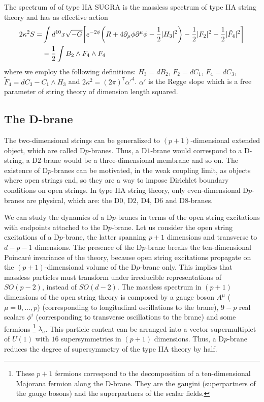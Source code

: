 The spectrum of of type IIA SUGRA is the massless spectrum of type IIA string theory and has as effective action 
\begin{align}
2\kappa^2 S=&\int d^{10}x \sqrt{-G}\qty[e^{-2\phi}\qty(R+4\partial_\mu\phi \partial^\mu\phi-\frac{1}{2}|H_3|^2)-\frac{1}{2}|F_2|^2-\frac{1}{2}|\tilde F_4|^2]\\& -\frac{1}{2}\int B_2\wedge F_4\wedge F_4
\end{align}
where we employ the following definitions:
$H_3=dB_2$, $F_2=dC_1$, $F_4=dC_3$, $\tilde F_4=dC_3 -C_1\wedge H_3$ and $2\kappa^2 =(2\pi)^7 \alpha'^4$.
$\alpha'$ is the Regge slope which is a free parameter of string theory of dimension length squared.


\subsection{The D-brane}

The two-dimensional strings can be generalized to $(p+1)$-dimensional extended object, which are called D$p$-branes.
Thus, a D$1$-brane would correspond to a D-string, a D$2$-brane would be a three-dimensional membrane and so on.
The existence of D$p$-branes can be motivated, in the weak coupling limit, as 
objects where open strings end, so they are a way to impose Dirichlet boundary conditions on open strings.
In type IIA string theory, only even-dimensional D$p$-branes are physical, which are: the D$0$, D$2$, D$4$, D$6$ and D$8$-branes.

We can study the dynamics of a D$p$-branes in terms of the open string excitations  with endpoints
attached to the D$p$-brane.
Let us consider the open string excitations of a D$p$-brane, the latter spanning $p+1$ dimensions and transverse to $d-p-1$ dimensions.
The presence of the D$p$-brane breaks the ten-dimensional Poincaré invariance of the theory, because
open string excitations propagate on the $(p+1)$-dimensional volume of the D$p$-brane only.
This implies that massless particles must transform under irreducible representations of $SO(p-2)$, instead of
$SO(d-2)$.
The massless spectrum in $(p+1)$ dimensions of the open string theory is composed by a gauge boson $A^\mu$ ($\mu=0,\ldots,p$) (corresponding
to longitudinal oscillations to the brane),
$9-p$ real scalars $\phi^i$ (corresponding to transverse oscillations to the brane) and some fermions
\footnote{
These $p+1$ fermions correspond to the decomposition of a ten-dimensional Majorana fermion along the D-brane. They are the gaugini (superpartners of the gauge bosons) and the superpartners of the scalar fields.}
$\lambda_a$.
This particle content can be arranged into a vector supermultiplet of $U(1)$ with $16$ supersymmetries
in $(p+1)$ dimensions. 
Thus, a D$p$-brane reduces the degree of supersymmetry of the type IIA theory by half.

